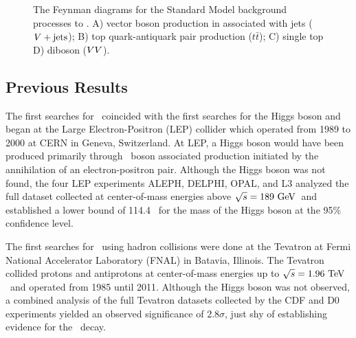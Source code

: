 \begin{figure}[htbp]
{     \qquad
  }
  \caption[\VHbb\ Background Process Diagrams]{The Feynman diagrams for the Standard Model background processes to \VHbb. A) vector boson production in associated with jets ($V+\textrm{jets}$); B) top quark-antiquark pair production ($t\bar{t}$); C) single top  D) diboson ($VV$).}
  \label{fig:VHbkgdiagrams}
\end{figure}

\subsection{Previous Results}

The first searches for \VHbb\ coincided with the first searches for the Higgs boson and began at the Large Electron-Positron (LEP) collider which operated from 1989 to 2000 at CERN in Geneva, Switzerland. At LEP, a Higgs boson would have been produced primarily through \bosZ\ boson associated production initiated by the annihilation of an electron-positron pair. Although the Higgs boson was not found, the four LEP experiments ALEPH, DELPHI, OPAL, and L3 analyzed the full dataset collected at center-of-mass energies above $\sqrt{s} = 189\ \mathrm{GeV}$\ and established a lower bound of 114.4 \GeV\ for the mass of the Higgs boson at the 95\% confidence level.\cite{LEPResult}

The first searches for \VHbb\ using hadron collisions were done at the Tevatron at Fermi National Accelerator Laboratory (FNAL) in Batavia, Illinois. The Tevatron collided protons and antiprotons at center-of-mass energies up to $\sqrt{s} = 1.96\ \mathrm{TeV}$\ and operated from 1985 until 2011. Although the Higgs boson was not observed, a combined analysis of the full Tevatron datasets collected by the CDF and D0 experiments yielded an observed significance of $2.8\sigma$, just shy of establishing evidence for the \VHbb\ decay.\cite{TevatronResult}

